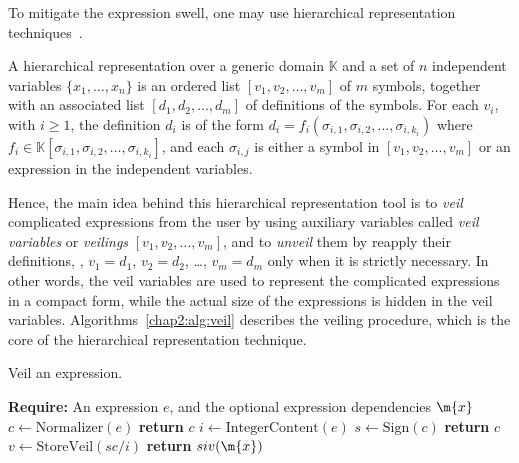 To mitigate the expression swell, one may use hierarchical representation techniques~\cite{carette2006linear, zhou2006hierarchical}.
%
\begin{definition}
  A hierarchical representation over a generic domain $\mathbb{K}$ and a set of $n$ independent variables $\{x_1, \dots, x_n\}$ is an ordered list $[v_1, v_2, \dots, v_m]$ of $m$ symbols, together with an associated list $[d_1, d_2, \dots, d_m]$ of definitions of the symbols. For each $v_i$, with $i \geq 1$, the definition $d_i$ is of the form $d_i = f_i(\sigma_{i,1}, \sigma_{i,2}, \dots, \sigma_{i,k_i})$ where $f_i \in \mathbb{K}[\sigma_{i,1}, \sigma_{i,2}, \dots, \sigma_{i,k_i}]$, and each $\sigma_{i,j}$ is either a symbol in $[v_1, v_2, \dots, v_m]$ or an expression in the independent variables.
\end{definition}
%
Hence, the main idea behind this hierarchical representation tool is to \emph{veil} complicated expressions from the user by using auxiliary variables called \emph{veil variables} or \emph{veilings} $[v_1, v_2, \dots, v_m]$, and to \emph{unveil} them by reapply their definitions, \ie{}, $v_1 = d_1$, $v_2 = d_2$, \dots, $v_m = d_m$ only when it is strictly necessary. In other words, the veil variables are used to represent the complicated expressions in a compact form, while the actual size of the expressions is hidden in the veil variables. Algorithms~\ref{chap2:alg:veil} describes the veiling procedure, which is the core of the hierarchical representation technique.

\begin{breakablealgorithm}
  \caption{Veil an expression.}
  \label{chap2:alg:veil}
  \begin{algorithmic}[1]
    \State \textbf{Require:} An expression $e$, and the optional expression dependencies $\m{x}$
     
    \State $c \gets \mathrm{Normalizer}(e)$ 
     
      \State \textbf{return} $c$ 
    \EndIf
    \State $i \gets \mathrm{IntegerContent}(e)$ 
    \State $s \gets \mathrm{Sign}(c)$ 
     
      \State \textbf{return} $c$ 
    \Else
      \State $v \gets \mathrm{StoreVeil}(sc/i)$ 
      \State \textbf{return} $siv(\m{x})$ 
    \EndIf
    \EndProcedure
  \end{algorithmic}
\end{breakablealgorithm}

